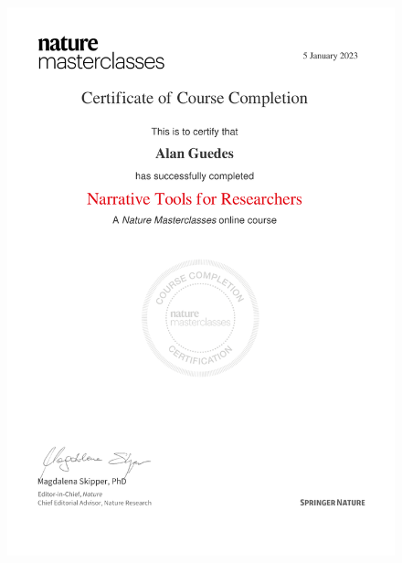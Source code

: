 \documentclass[10pt,a4paper,sans,colorlinks]{moderncv}
\begin{document}
\begin{figure}
    \includegraphics[align=t,width=\textwidth,height=0.4\paperheight, keepaspectratio=true]{certificates/ucl-training/Narrative_Tools_for_Researchers.pdf}
\end{figure}
\end{document}

